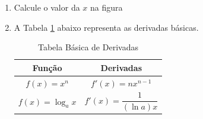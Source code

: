 \documentclass[a4paper,12pt]{article}
\begin{document}
   \begin{enumerate}
      \item Calcule o valor da $x$ na figura %
      \item A Tabela \ref{minha-tabela} abaixo representa as derivadas básicas.
  
      \begin{table}[!htb]
      \centering
      \begin{tabular}{|c||c|} \hline
      Função & Derivadas \\ \hline \hline
         $f(x)= x^n$ & $f'(x) = nx^{n-1}$\\ $f(x) = \log_a x$ & $f'(x)= \dfrac{1}{(\ln a)x}$ \\ \hline
      \end{tabular}
      \caption{Tabela Básica de Derivadas}
      \label{minha-tabela}
      \end{table}
   \end{enumerate}
\end{document}
